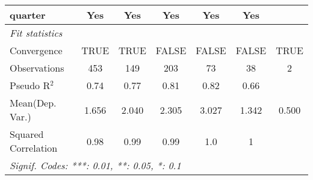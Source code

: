 \begin{tabular}{lcccccc}
   quarter                                                    & Yes          & Yes        & Yes         & Yes     & Yes            & \\  
   \midrule
   \emph{Fit statistics}\\
   Convergence                                                &TRUE          & TRUE       & FALSE       & FALSE   & FALSE          & TRUE\\  
   Observations                                               & 453          & 149        & 203         & 73      & 38             & 2\\  
   Pseudo R$^2$                                               & 0.74         & 0.77       & 0.81        & 0.82    & 0.66           & \\  
Mean(Dep. Var.) & 1.656 & 2.040 & 2.305 & 3.027 & 1.342 & 0.500 \\
   Squared Correlation                                        & 0.98         & 0.99       & 0.99        & 1.0     & 1              & \\  
   \midrule \midrule
   \multicolumn{7}{l}{\emph{Signif. Codes: ***: 0.01, **: 0.05, *: 0.1}}\\
\end{tabular}
\par\endgroup
